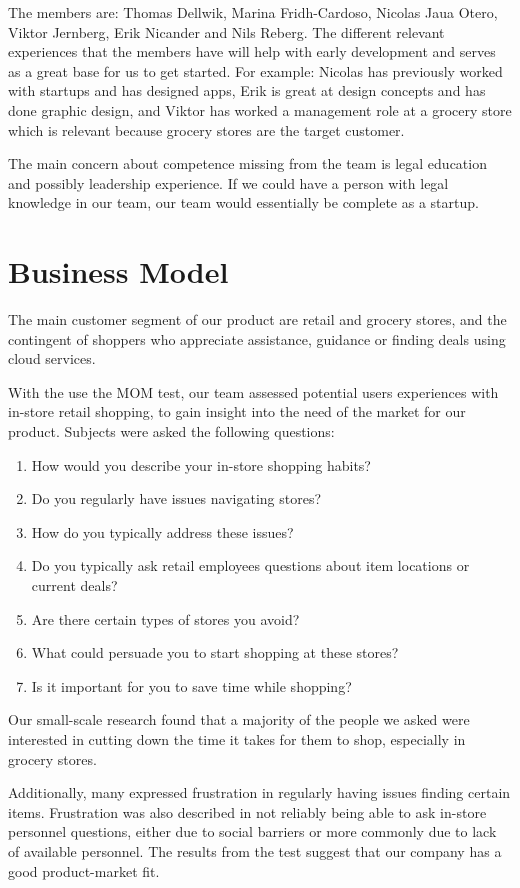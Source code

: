 \documentclass[titlepage]{article}
\begin{document}
The members are: Thomas Dellwik, Marina Fridh-Cardoso, Nicolas Jaua Otero, Viktor Jernberg, Erik Nicander and Nils Reberg. The different relevant experiences that the members have will help with early development and serves as a great base for us to get started. For example: Nicolas has previously worked with startups and has designed apps, Erik is great at design concepts and has done graphic design, and Viktor has worked a management role at a grocery store which is relevant because grocery stores are the target customer.

The main concern about competence missing from the team  is legal education and possibly leadership experience. If we could have a person with legal knowledge in our team, our team would essentially be complete as a startup.

\section{Business Model}
The main customer segment of our product are retail and grocery stores, and the contingent of shoppers who appreciate assistance, 
guidance or finding deals using cloud services. 

With the use the MOM test, our team assessed potential users experiences with in-store retail shopping, to gain insight into the need of the market for our product. Subjects were asked the following questions:
\begin{enumerate}
    \item How would you describe your in-store shopping habits?
    \item Do you regularly have issues navigating stores?
    \item How do you typically address these issues?
    \item Do you typically ask retail employees questions about item locations or current deals?
    \item Are there certain types of stores you avoid?
    \item What could persuade you to start shopping at these stores?
    \item Is it important for you to save time while shopping?
\end{enumerate}
Our small-scale research found that a majority of the people we asked were interested in cutting down the time it takes for them to shop, especially in grocery stores. 

Additionally, many expressed frustration in regularly having issues finding certain items. Frustration was also described in not reliably being able to ask in-store personnel questions, either due to social barriers or more commonly due to lack of available personnel. The results from the test suggest that our company has a good product-market fit.
\end{document}
